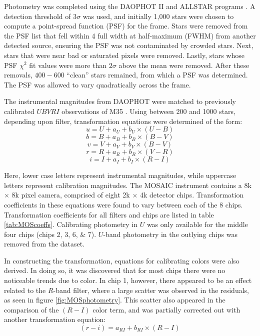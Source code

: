 \documentclass[iop]{emulateapj}
\begin{document}
Photometry was completed using the DAOPHOT II and ALLSTAR programs \citep{1987PASP...99..191S}. A detection threshold of $3\sigma$ was used, and initially 1,000 stars were chosen to compute a point-spread function (PSF) for the frame. Stars were removed from the PSF list that fell within 4 full width at half-maximum (FWHM) from another detected source, ensuring the PSF was not contaminated by crowded stars. Next, stars that were near bad or saturated pixels were removed. Lastly, stars whose PSF $\chi^2$ fit values were more than $2\sigma$ above the mean were removed. After these removals, $400-600$ ``clean'' stars remained, from which a PSF was determined. The PSF was allowed to vary quadratically across the frame.

The instrumental magnitudes from DAOPHOT were matched to previously calibrated $UBVRI$ observations of M35 \citep{2000AAS...196.4206S}. Using between 200 and 1000 stars, depending upon filter, transformation equations were determined of the form:
\begin{equation} \label{eq:Utrans}
	u = U + a_U + b_U \times (U-B)
\end{equation}
\begin{equation} \label{eq:Btrans}
	b = B + a_B + b_B \times (B-V)
\end{equation}
\begin{equation} \label{eq:Vtrans}
	v = V + a_V + b_V \times (B-V)
\end{equation}
\begin{equation} \label{eq:Rtrans}
	r = R + a_R + b_R \times (V-R)
\end{equation}
\begin{equation} \label{eq:Itrans}
	i = I + a_I + b_I \times (R-I)
\end{equation}

Here, lower case letters represent instrumental magnitudes, while uppercase letters represent calibration magnitudes. The MOSAIC instrument contains a 8k $\times$ 8k pixel camera, comprised of eight 2k $\times$ 4k detector chips. Transformation coefficients in these equations were found to vary between each of the 8 chips. Transformation coefficients for all filters and chips are listed in table \ref{tab:MOScoeffs}. Calibrating photometry in $U$ was only available for the middle four chips (chips 2, 3, 6, \& 7). $U$-band photometry in the outlying chips was removed from the dataset. 

In constructing the transformation, equations for calibrating colors were also derived. In doing so, it was discovered that for most chips there were no noticeable trends due to color. In chip 1, however, there appeared to be an effect related to the $R$-band filter, where a large scatter was observed in the residuals, as seen in figure \ref{fig:MOSphotometry}. This scatter also appeared in the comparison of the $(R-I)$ color term, and was partially corrected out with another transformation equation:
\begin{equation}
	(r-i) = a_{RI} + b_{RI} \times (R-I)
\end{equation} 
\end{document}
